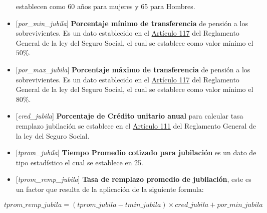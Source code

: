 \documentclass[
  letterpaper,
  DIV=11,
  numbers=noendperiod]{scrreprt}
\begin{document}
\begin{itemize}
  establecen como 60 años para mujeres y 65 para Hombres.
\item
  {[}\emph{por\_min\_jubila}{]} \textbf{Porcentaje mínimo de
  transferencia} de pensión a los sobrevivientes. Es un dato establecido
  en el
  \href{https://www.ilo.org/dyn/travail/docs/930/Reglamento\%20General\%20de\%20la\%20\%20Ley\%20del\%20IHSS.pdf}{Artículo
  117} del Reglamento General de la ley del Seguro Social, el cual se
  establece como valor mínimo el \(50\%\).
\item
  {[}\emph{por\_max\_jubila}{]} \textbf{Porcentaje máximo de
  transferencia} de pensión a los sobrevivientes. Es un dato establecido
  en el
  \href{https://www.ilo.org/dyn/travail/docs/930/Reglamento\%20General\%20de\%20la\%20\%20Ley\%20del\%20IHSS.pdf}{Artículo
  117} del Reglamento General de la ley del Seguro Social, el cual se
  establece como valor mínimo el \(80\%\).
\item
  {[}\emph{cred\_jubila}{]} \textbf{Porcentaje de Crédito unitario
  anual} para calcular tasa remplazo jubilación se establece en el
  \href{https://www.ilo.org/dyn/travail/docs/930/Reglamento\%20General\%20de\%20la\%20\%20Ley\%20del\%20IHSS.pdf}{Artículo
  111} del Reglamento General de la ley del Seguro Social.
\item
  {[}\emph{tprom\_jubila}{]} \textbf{Tiempo Promedio cotizado para
  jubilación} es un dato de tipo estadístico el cual se establece en 25.
\item
  {[}\emph{tprom\_remp\_jubila}{]} \textbf{Tasa de remplazo promedio de
  jubilación}, este es un factor que resulta de la aplicación de la
  siguiente formula:
\end{itemize}

\begin{equation} 
tprom\_remp\_jubila = \left ( tprom\_jubila - tmin\_jubila \right ) \times cred\_jubila + por\_min\_jubila
 \label{eq:tpromjubila}
\end{equation}
\end{document}
